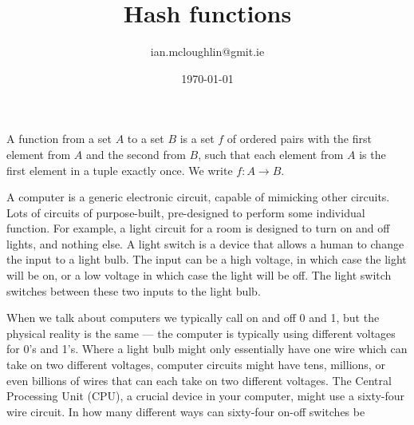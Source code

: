\documentclass{notes}
\title{Hash functions}
\author{ian.mcloughlin@gmit.ie}
\date{\today}
\begin{document}
  

  


    \begin{definition}[Functions] A function from a set $A$ to a set $B$ is a set $f$ of ordered pairs with the first element from $A$ and the second from $B$, such that each element from $A$ is the first element in a tuple exactly once. We write $f:A \rightarrow B$.
    \end{definition}

    

  A computer is a generic electronic circuit, capable of mimicking other circuits.
  Lots of circuits of purpose-built, pre-designed to perform some individual function.
  For example, a light circuit for a room is designed to turn on and off lights, and nothing else.
  A light switch is a device that allows a human to change the input to a light bulb.
  The input can be a high voltage, in which case the light will be on, or a low voltage in which case the light will be off.
  The light switch switches between these two inputs to the light bulb.

  When we talk about computers we typically call on and off 0 and 1, but the physical reality is the same --- the computer is typically using different voltages for 0's and 1's.
  Where a light bulb might only essentially have one wire which can take on two different voltages, computer circuits might have tens, millions, or even billions of wires that can each take on two different voltages.
  The Central Processing Unit (CPU), a crucial device in your computer, might use a sixty-four wire circuit.
  In how many different ways can sixty-four on-off switches be 


  
\end{document}
